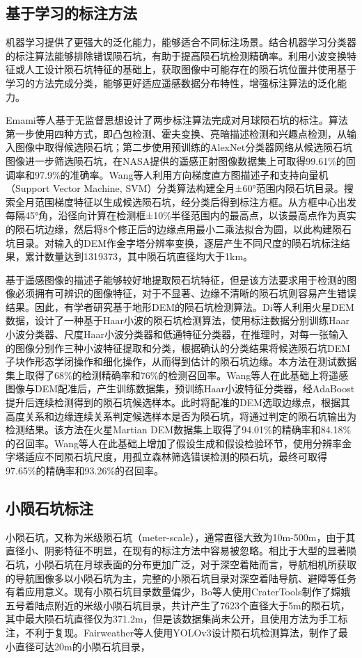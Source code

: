 \documentclass{article}
\begin{document}
\subsection{基于学习的标注方法}
机器学习提供了更强大的泛化能力，能够适合不同标注场景。结合机器学习分类器的标注算法能够排除错误陨石坑，有助于提高陨石坑检测精确率。利用小波变换特征或人工设计陨石坑特征的基础上，获取图像中可能存在的陨石坑位置并使用基于学习的方法完成分类，能够更好适应遥感数据分布特性，增强标注算法的泛化能力。\par
Emami\cite{emamiCraterDetectionUsing2019}等人基于无监督思想设计了两步标注算法完成对月球陨石坑的标注。算法第一步使用四种方式，即凸包检测、霍夫变换、亮暗描述检测和兴趣点检测，从输入图像中取得候选陨石坑；第二步使用预训练的AlexNet分类器网络从候选陨石坑图像进一步筛选陨石坑，在NASA提供的遥感正射图像数据集上可取得99.61\%的回调率和97.9\%的准确率。Wang\cite{wangImprovedGlobalCatalog2021}等人利用方向梯度直方图描述子和支持向量机（Support Vector Machine, SVM）分类算法构建全月±60°范围内陨石坑目录。搜索全月范围梯度特征以生成候选陨石坑，经分类后得到标注方框。从方框中心出发每隔45°角，沿径向计算在检测框±10\%半径范围内的最高点，以该最高点作为真实的陨石坑边缘，然后将8个修正后的边缘点用最小二乘法拟合为圆，以此构建陨石坑目录。对输入的DEM作金字塔分辨率变换，逐层产生不同尺度的陨石坑标注结果，累计数量达到1319373，其中陨石坑直径均大于1km。\par
基于遥感图像的描述子能够较好地提取陨石坑特征，但是该方法要求用于检测的图像必须拥有可辨识的图像特征，对于不显著、边缘不清晰的陨石坑则容易产生错误结果。因此，有学者研究基于地形DEM的陨石坑检测算法。Di\cite{diMachineLearningApproach2014}等人利用火星DEM数据，设计了一种基于Haar小波的陨石坑检测算法，使用标注数据分别训练Haar小波分类器、尺度Haar小波分类器和低通特征分类器，在推理时，对每一张输入的图像分别作三种小波特征提取和分类，根据确认的分类结果将候选陨石坑DEM子块作形态学闭操作和细化操作，从而得到估计的陨石坑边缘。本方法在测试数据集上取得了68\%的检测精确率和76\%的检测召回率。Wang\cite{wangActiveMachineLearning2019}等人在此基础上将遥感图像与DEM配准后，产生训练数据集，预训练Haar小波特征分类器，经AdaBoost提升后连续检测得到的陨石坑候选样本。此时将配准的DEM选取边缘点，根据其高度关系和边缘连续关系判定候选样本是否为陨石坑，将通过判定的陨石坑输出为检测结果。该方法在火星Martian DEM数据集上取得了94.01\%的精确率和84.18\%的召回率。Wang\cite{wangNovelApproachMultiscale2022}等人在此基础上增加了假设生成和假设检验环节，使用分辨率金字塔适应不同陨石坑尺度，用孤立森林筛选错误检测的陨石坑，最终可取得97.65\%的精确率和93.26\%的召回率。
\subsection{小陨石坑标注}
小陨石坑，又称为米级陨石坑（meter-scale），通常直径大致为10m-500m，由于其直径小、阴影特征不明显，在现有的标注方法中容易被忽略。相比于大型的显著陨石坑，小陨石坑在月球表面的分布更加广泛，对于深空着陆而言，导航相机所获取的导航图像多以小陨石坑为主，完整的小陨石坑目录对深空着陆导航、避障等任务有着应用意义。现有小陨石坑目录数量偏少，Bo\cite{boCatalogueMeterscaleImpact2022}等人使用CraterTools制作了嫦娥五号着陆点附近的米级小陨石坑目录，共计产生了7623个直径大于5m的陨石坑，其中最大陨石坑直径仅为371.2m，但是该数据集尚未公开，且使用方法为手工标注，不利于复现。Fairweather\cite{fairweatherAutomaticMappingSmall2022}等人使用YOLOv3设计陨石坑检测算法，制作了最小直径可达20m的小陨石坑目录，
\end{document}
